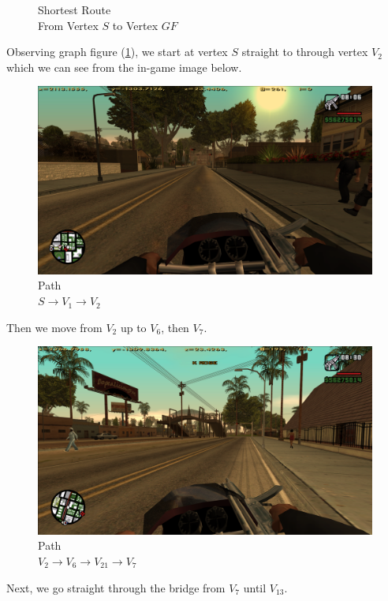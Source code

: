 \documentclass{article}
\begin{document}
	\clearpage
	\begin{figure}[!h]
		\centering
		
		\caption{\centering Shortest Route \\ From Vertex \(S\) to Vertex \(GF\)}
		\label{shortest_route}
	\end{figure} Observing graph figure (\ref{shortest_route}), we start at vertex \(S\) straight to through vertex \(V_{2}\) which we can see from the in-game image below.
	\clearpage
	\begin{figure}[!h]
		\centering
		\includegraphics[width=\textwidth]{./0img/path1}
		\caption{Path \\ \(S \to V_{1} \to V_{2}\)}
	\end{figure} Then we move from \(V_{2}\) up to \(V_{6}\), then \(V_{7}\).
		\begin{figure}[!h]
		\centering
		\includegraphics[width=\textwidth]{./0img/path2}
		\caption{Path \\ \(V_{2} \to V_{6} \to V_{21} \to V_{7}\)}
	\end{figure} Next, we go straight through the bridge from \(V_{7}\) until \(V_{13}\).
\end{document}
